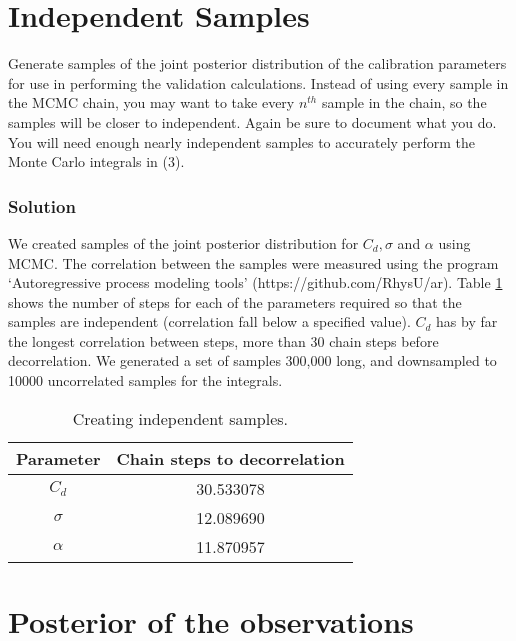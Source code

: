 \documentclass{article}
\providecommand{\tabularnewline}{\\}
\begin{document}
\section{Independent Samples}

Generate samples of the joint posterior distribution of the calibration
parameters for use in performing the validation calculations. Instead
of using every sample in the MCMC chain, you may want to take every
$n^{th}$ sample in the chain, so the samples will be closer to independent.
Again be sure to document what you do. You will need enough nearly
independent samples to accurately perform the Monte Carlo integrals
in (3).


\subsubsection*{Solution}

We created samples of the joint posterior distribution for $C_{d},\sigma$
and $\alpha$ using MCMC. The correlation between the samples were
measured using the program `Autoregressive process modeling tools'
(https://github.com/RhysU/ar). Table \ref{table:creatingindesamples}
shows the number of steps for each of the parameters required so that
the samples are independent (correlation fall below a specified value).
$C_{d}$ has by far the longest correlation between steps, more than
30 chain steps before decorrelation. We generated a set of samples
300,000 long, and downsampled to 10000 uncorrelated samples for the
integrals.

\begin{table}
\begin{centering}
\begin{tabular}{|c|c|}
\hline
Parameter & Chain steps to decorrelation\tabularnewline
\hline
\hline
$C_{d}$ & 30.533078\tabularnewline
\hline
$\sigma$ & 12.089690\tabularnewline
\hline
$\alpha$ & 11.870957\tabularnewline
\hline
\end{tabular}
\par\end{centering}

\caption{Creating independent samples.}


\label{table:creatingindesamples}
\end{table}



\section{Posterior of the observations}
\end{document}
